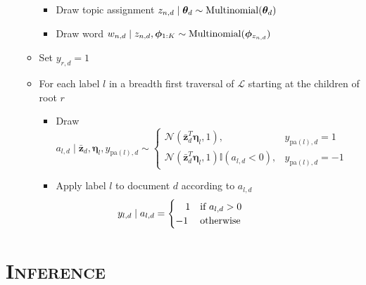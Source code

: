 \documentclass[portrait]{sciposter}
\begin{document}
\begin{multicols}{3}
\begin{enumerate}
\begin{itemize}
\begin{itemize}
\item Draw topic assignment $z_{n,d}\mid\boldsymbol\theta_d\sim{\rm Multinomial}(\boldsymbol\theta_d)$ 
\item Draw word $w_{n,d}\mid z_{n,d},\boldsymbol\phi_{1:K}\sim{\rm Multinomial}(\boldsymbol\phi_{z_{n,d}})$ 
\end{itemize}
\item Set $y_{r,d} = 1$
\item For each label $l$ in a breadth first traversal of $\mathcal{L}$ starting at the children of  root $r$

\begin{itemize}
\item Draw $a_{l,d}\mid \bar{\mathbf{z}}_d,\boldsymbol\eta_{l},y_{\mathrm{pa}(l),d}\sim\begin{cases}
\mathcal{N}(\bar{\mathbf{z}}^{T}_d\boldsymbol\eta_{l},1), & y_{\mathrm{pa}(l),d}=1\\
\mathcal{N}(\bar{\mathbf{z}}^{T}_d\boldsymbol\eta_{l},1)\mathbb{I}(a_{l,d}<0), & y_{\mathrm{pa}(l),d}=-1\end{cases}$ %
 
\item Apply label $l$ to document $d$ according to $a_{l,d}$ \[\hspace{-2cm}
y_{l,d}\mid a_{l,d}=\begin{cases}
\ \ \ 1 & \text{if \ensuremath{a_{l,d}>0}} \\%
-1 & \text{otherwise}\end{cases}\]
 
\end{itemize}
\end{itemize}
\end{enumerate}

\section{\textsc{Inference}}


\end{multicols}
\end{document}
